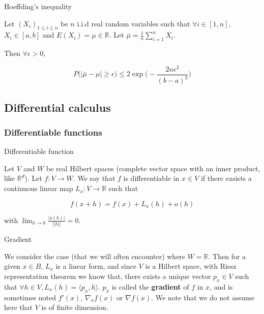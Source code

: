 \documentclass[
10pt, %
a4paper, %
oneside, %
headinclude,footinclude, %
BCOR5mm, %
]{scrartcl}
\begin{document}
\begin{theorem}{Hoeffding's inequality}

    Let $(X_i)_{1\leq i\leq n}$ be $n$ i.i.d real random variables such that $\forall i\in [1, n]$, $X_i\in [a,b]$ and $ E(X_i)= \mu \in \mathbb{R} $.  Let $	\bar{\mu} = \frac{1}{n} \sum^{n}_{i=1} X_i$.

    Then $\forall \epsilon >0$,

    \begin{equation*}
	P\Big(| \bar{\mu}-\mu|\geq \epsilon \Big) \leq 2 \exp\Big( -\frac{2n\epsilon^2}{(b-a)^2} \Big)
    \end{equation*}
\end{theorem}

\subsection{\large\color{MidnightBlue}Differential calculus}

\subsubsection{\large\color{Periwinkle}Differentiable functions}

\begin{definition}{Differentiable function}
    \label{def:diff}

    Let $V$ and $W$ be real Hilbert spaces (complete vector space with an inner product, like $\mathbb{R}^d$). Let $f: V\rightarrow W $. We say that $f$ is differentiable in $x\in V$ if there exsists a continuous linear map $L_x:V\rightarrow \mathbb{R} $ such that

    \begin{equation*}
	f(x+h)=f(x)+L_x(h)+o(h)
    \end{equation*}

    with $ \lim_{h\rightarrow 0} \frac{|o(h)|}{||h||} =0$.
\end{definition}

\begin{definition}{Gradient}
    \label{def:gradient}

    We consider the case (that we will often encounter) where $W= \mathbb{R}$. Then for a given $x\in B$, $L_x$ is a linear form, and since $V$ is a Hilbert space, with Riesz representation theorem we know that, there exists a unique vector $p_x\in V$ such that $\forall h\in V, L_x(h)= \langle p_x, h \rangle$. $p_x$ is called the \textbf{gradient} of $f$ in $x$, and is sometimes noted $f'(x)$,  $ \nabla_xf(x)$ or $\nabla f(x)$. We note that we do not assume here that $V$ is of finite dimension.
\end{definition}
\end{document}
